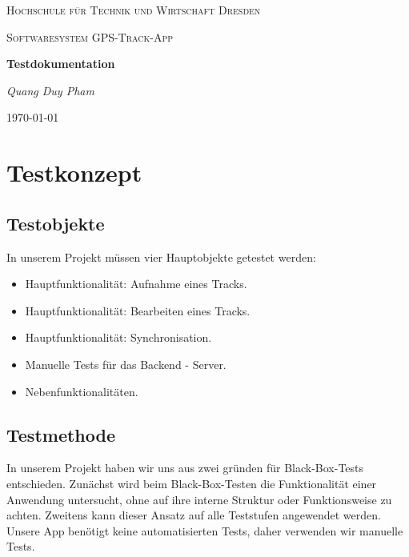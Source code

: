 \documentclass{article}
\begin{document}
\begin{titlepage}
    \centering
    {\scshape\LARGE Hochschule für Technik und Wirtschaft Dresden \par}
    \vspace{1cm}
    {\scshape\Large Softwaresystem \glqq GPS-Track-App\grqq\par}
    \vspace{1.5cm}
    {\huge\bfseries Testdokumentation\par}
    \vspace{2cm}
    {\Large\itshape Quang Duy Pham\par}
    \vfill

    {\large \today\par}
\end{titlepage}
\tableofcontents
\newpage

\section{Testkonzept}
\subsection{Testobjekte}
	In unserem Projekt müssen vier Hauptobjekte getestet werden:
	\begin{itemize}
		\item Hauptfunktionalität: Aufnahme eines Tracks.
		\item Hauptfunktionalität: Bearbeiten eines Tracks.
		\item Hauptfunktionalität: Synchronisation.
		\item Manuelle Tests für das Backend - Server.
		\item Nebenfunktionalitäten.
	\end{itemize}

\subsection{Testmethode}
	In unserem Projekt haben wir uns aus zwei gründen für Black-Box-Tests entschieden. Zunächst wird beim Black-Box-Testen die Funktionalität einer Anwendung untersucht, ohne auf ihre interne Struktur oder Funktionsweise zu achten. Zweitens kann dieser Ansatz auf alle Teststufen angewendet werden. Unsere App benötigt keine automatisierten Tests, daher verwenden wir manuelle Tests. \par
\end{document}
